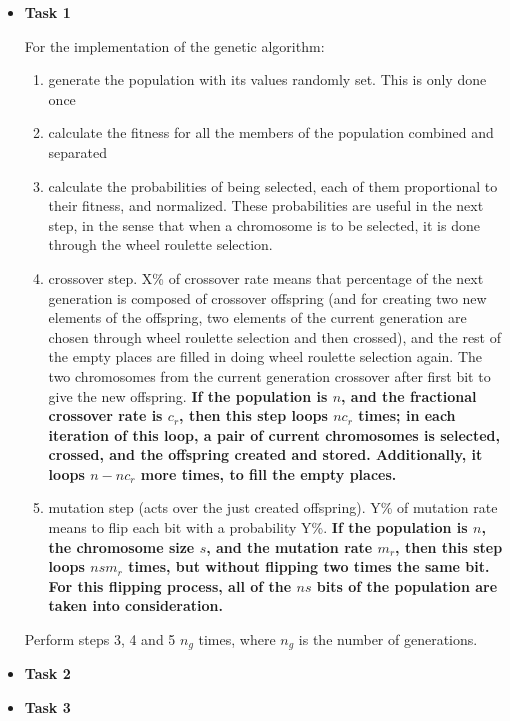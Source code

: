 \documentclass[paper=a4, fontsize=11pt]{scrartcl} %
\numberwithin{equation}{section} %
\numberwithin{figure}{section} %
\numberwithin{table}{section} %
\begin{document}
\begin{itemize}

\item \textbf{Task 1}

For the implementation of the genetic algorithm:

\begin{enumerate}

\item generate the population with its values randomly set. This is only done once

\item calculate the fitness for all the members of the population combined and separated

\item calculate the probabilities of being selected, each of them proportional to their fitness, and normalized. These probabilities are useful in the next step, in the sense that when a chromosome is to be selected, it is done through the wheel roulette selection.

\item crossover step. X\% of crossover rate means that percentage of the next generation is composed of crossover offspring (and for creating two new elements of the offspring, two elements of the current generation are chosen through wheel roulette selection and then crossed), and the rest of the empty places are filled in doing wheel roulette selection again. The two chromosomes from the current generation crossover after first bit to give the new offspring. \textbf{If the population is $n$, and the fractional crossover rate is $c_{r}$, then this step loops $nc_{r}$ times; in each iteration of this loop, a pair of current chromosomes is selected, crossed, and the offspring created and stored. Additionally, it loops $n-nc_{r}$ more times, to fill the empty places.}

\item mutation step (acts over the just created offspring). Y\% of mutation rate means to flip each bit with a probability Y\%. \textbf{If the population is $n$, the chromosome size $s$, and the mutation rate $m_{r}$, then this step loops $nsm_{r}$ times, but without flipping two times the same bit. For this flipping process, all of the $ns$ bits of the population are taken into consideration.}


\end{enumerate}

Perform steps 3, 4 and 5 $n_{g}$ times, where $n_{g}$ is the number of generations.

\item \textbf{Task 2}



\item \textbf{Task 3}




\end{itemize}
\end{document}
